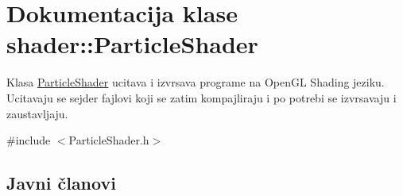\hypertarget{classshader_1_1ParticleShader}{}\section{Dokumentacija klase shader\+:\+:Particle\+Shader}
\label{classshader_1_1ParticleShader}


Klasa \hyperlink{classshader_1_1ParticleShader}{Particle\+Shader} ucitava i izvrsava programe na Open\+GL Shading jeziku. Ucitavaju se sejder fajlovi koji se zatim kompajliraju i po potrebi se izvrsavaju i zaustavljaju.  




{\ttfamily \#include $<$Particle\+Shader.\+h$>$}

\subsection*{Javni članovi}

